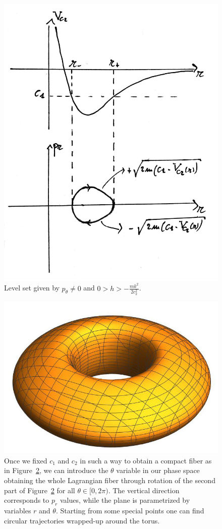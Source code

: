 \documentclass[main.tex]{subfiles}
\begin{document}
\begin{example}
\begin{enumerate}
\begin{figure}[H]
			\label{fig:Kepler_c2_neq_0}
		\end{figure}
		\begin{figure}[H]
			\centering
			\includegraphics[width=.55\textwidth]{figures/KeplerCompactFiber.jpg}
			\caption{Level set given by $p_\theta \neq 0$ and $0 > h > -\frac{mk^2}{2c_2^2}$.}
			\label{fig:KeplerCompactFiber}
		\end{figure}
		\begin{figure}[H]
			\centering
			\includegraphics[width=.55\textwidth]{figures/Kepler_Lagrangian_fiber.jpeg}
			\caption{Once we fixed $c_1$ and $c_2$ in such a way to obtain a compact fiber as in Figure~\ref{fig:KeplerCompactFiber}, we can introduce the $\theta$ variable in our phase space obtaining the whole Lagrangian fiber through rotation of the second part of  Figure~\ref{fig:KeplerCompactFiber} for all $\theta \in [0, 2\pi)$. The vertical direction corresponds to $p_r$ values, while the plane is parametrized by variables $r$ and $\theta$. Starting from some special points one can find circular trajectories wrapped-up around the torus.}
			\label{fig:KeplerLagrangianFiber}
		\end{figure}
		

\end{enumerate}
\end{example}
\end{document}
